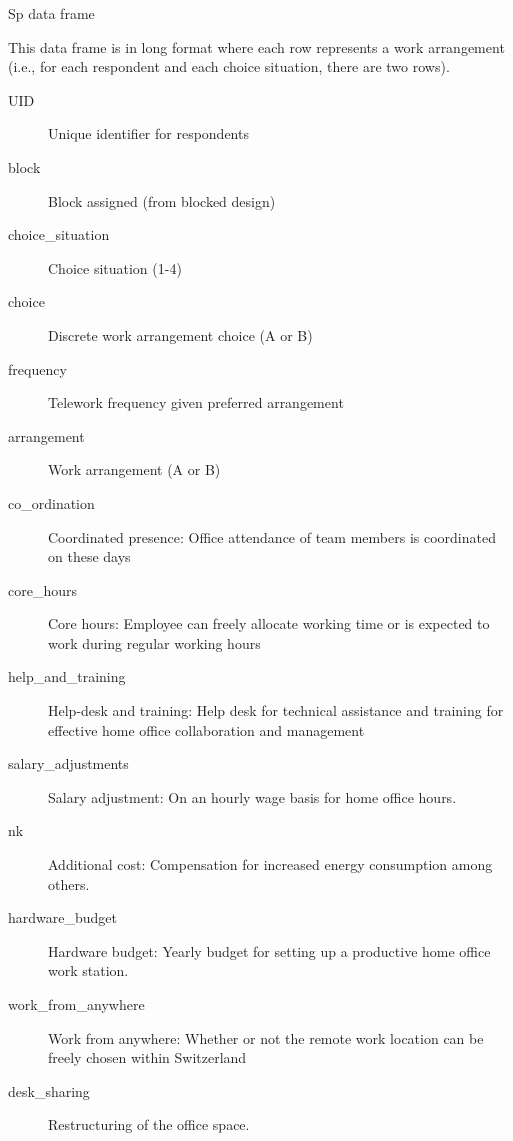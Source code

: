 \begin{Section}{Sp data frame}

This data frame is in long format where each row represents a work arrangement
(i.e., for each respondent and each choice situation, there are two rows).
\begin{description}

\item[UID] Unique identifier for respondents
\item[block] Block assigned (from blocked design)
\item[choice\_situation] Choice situation (1-4)
\item[choice] Discrete work arrangement choice (A or B)
\item[frequency] Telework frequency given preferred arrangement
\item[arrangement] Work arrangement (A or B)
\item[co\_ordination] Coordinated presence: Office attendance of team members is coordinated on these days
\item[core\_hours] Core hours: Employee can freely allocate working time or is expected to work during regular working hours
\item[help\_and\_training] Help-desk and training: Help desk for technical assistance and training for effective home office collaboration and management
\item[salary\_adjustments] Salary adjustment: On an hourly wage basis for home office hours.
\item[nk] Additional cost: Compensation for increased energy consumption among others.
\item[hardware\_budget] Hardware budget: Yearly budget for setting up a productive home office work station.
\item[work\_from\_anywhere] Work from anywhere: Whether or not the remote work location can be freely chosen within Switzerland
\item[desk\_sharing] Restructuring of the office space.

\end{description}

\end{Section}
%
\begin{SeeAlso}
\end{SeeAlso}

